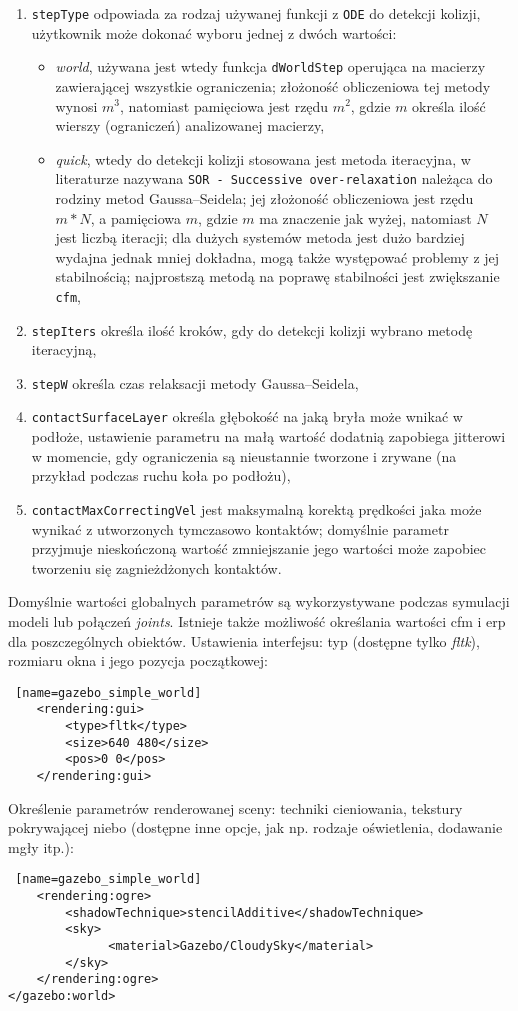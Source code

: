 \begin {enumerate}
	 \item \texttt{stepType} odpowiada za rodzaj używanej funkcji z \texttt{ODE} do detekcji kolizji, użytkownik może dokonać wyboru jednej z dwóch wartości:
	      \begin{itemize}
	       \item \textit{world}, używana jest wtedy funkcja \texttt{dWorldStep} operująca na macierzy zawierającej wszystkie ograniczenia; złożoność obliczeniowa tej metody wynosi $m^3$, natomiast pamięciowa
jest rzędu $m^2$, gdzie $m$ określa ilość wierszy (ograniczeń) analizowanej macierzy,
	       \item \textit{quick}, wtedy do detekcji kolizji stosowana jest metoda iteracyjna, w literaturze nazywana \texttt{SOR - Successive over-relaxation} należąca do rodziny metod Gaussa–Seidela; jej złożoność obliczeniowa jest rzędu $m*N$,
		a pamięciowa $m$, gdzie $m$ ma znaczenie jak wyżej,
		natomiast $N$ jest liczbą iteracji; dla dużych systemów metoda jest dużo bardziej wydajna jednak mniej dokładna, mogą także występować problemy z jej stabilnością; najprostszą metodą na poprawę stabilności
		jest zwiększanie \texttt{cfm}, 
	      \end{itemize}
	 \item \texttt{stepIters} określa ilość kroków, gdy do detekcji kolizji wybrano metodę iteracyjną,
	 \item \texttt{stepW} określa czas relaksacji metody Gaussa–Seidela, 
	 \item \texttt{contactSurfaceLayer} określa głębokość na jaką bryła może wnikać w podłoże, ustawienie parametru na małą wartość dodatnią zapobiega jitterowi w momencie, gdy ograniczenia są nieustannie tworzone
	  i zrywane (na przykład podczas ruchu koła po podłożu),
	 \item \texttt{contactMaxCorrectingVel} jest maksymalną korektą prędkości jaka może wynikać z utworzonych tymczasowo kontaktów; domyślnie parametr przyjmuje nieskończoną wartość zmniejszanie jego
	   wartości może zapobiec tworzeniu się zagnieżdżonych kontaktów. 
	\end {enumerate}
	
	Domyślnie wartości globalnych parametrów są wykorzystywane podczas symulacji modeli lub połączeń \textit{joints}. Istnieje także możliwość określania wartości cfm i erp
	dla poszczególnych obiektów.\newline
	Ustawienia interfejsu: typ (dostępne tylko \textit{fltk}), rozmiaru okna i jego pozycja początkowej:
\begin{lstlisting} [name=gazebo_simple_world]
    <rendering:gui>
        <type>fltk</type>
        <size>640 480</size>
        <pos>0 0</pos>
    </rendering:gui>
\end{lstlisting}
	Określenie parametrów renderowanej sceny: techniki cieniowania, tekstury pokrywającej niebo (dostępne inne opcje, jak np. rodzaje oświetlenia, dodawanie mgły itp.):
\begin{lstlisting} [name=gazebo_simple_world]
    <rendering:ogre>
        <shadowTechnique>stencilAdditive</shadowTechnique>
        <sky>
              <material>Gazebo/CloudySky</material>
        </sky>
    </rendering:ogre>
</gazebo:world>
\end{lstlisting}

